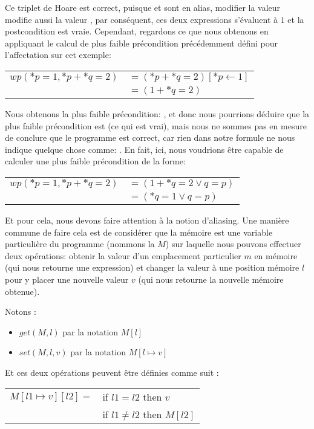 Ce triplet de Hoare est correct, puisque  et  sont en
alias, modifier la valeur  modifie aussi la valeur ,
par conséquent, ces deux expressions s'évaluent à $1$ et la postcondition est 
vraie. Cependant, regardons ce que nous obtenons en appliquant le calcul de plus
faible précondition précédemment défini pour l'affectation sur cet exemple:


\begin{tabular}{ll}
$wp(*p = 1, *p + *q = 2)$ & $= (*p + *q = 2)[*p \leftarrow 1]$\\
                          & $= (1 + *q = 2)$
\end{tabular}


Nous obtenons la plus faible précondition: , et donc 
nous pourrions déduire que la plus faible précondition est 
(ce qui est vrai), mais nous ne sommes pas en mesure de conclure que le programme
est correct, car rien dans notre formule ne nous indique quelque chose comme:
. En fait, ici, nous voudrions être capable de 
calculer une plus faible précondition de la forme:


\begin{tabular}{ll}
$wp(*p = 1, *p + *q = 2)$ & $= (1 + *q = 2 \vee q = p)$\\
                          & $= (*q = 1 \vee q = p)$
\end{tabular}


Et pour cela, nous devons faire attention à la notion d'aliasing. Une manière
commune de faire cela est de considérer que la mémoire est une variable particulière
du programme (nommons la $M$) sur laquelle nous pouvons effectuer deux opérations:
obtenir la valeur d'un emplacement particulier $m$ en mémoire (qui nous retourne une
expression) et changer la valeur à une position mémoire $l$ pour y placer une nouvelle
valeur $v$ (qui nous retourne la nouvelle mémoire obtenue).


Notons :


\begin{itemize}
\item $get(M,l)$ par la notation $M[l]$
\item $set(M,l,v)$ par la notation $M[l \mapsto v]$
\end{itemize}


Et ces deux opérations peuvent être définies comme suit :


\begin{tabular}{ll}
  $M[l1 \mapsto v][l2] =$ & if $l1   =  l2$ then $v$ \\
                          & if $l1 \neq l2$ then $M[l2]$
\end{tabular}


